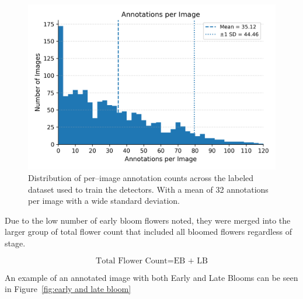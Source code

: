 

\begin{figure}[!ht]
    \centering
    \includegraphics[width=0.75\linewidth]{images/Annotations per Image.png}
    \caption{Distribution of per–image annotation counts across the labeled dataset used to train the detectors. With a mean of 32 annotations per image with a wide standard deviation.}

    \label{fig:Annotations per Image}
\end{figure}


Due to the low number of early bloom flowers noted, they were merged into the larger group of total flower count that included all bloomed flowers regardless of stage.

\begin{equation}
\label{eq:TFC}
\text{Total Flower Count} = {\text{EB + LB}}
\end{equation}
\vspace{10pt}

An example of an annotated image with both Early and Late Blooms can be seen in Figure~\ref{fig:early and late bloom}

